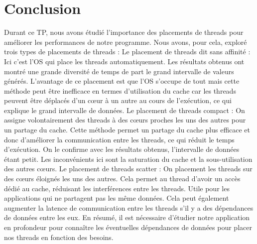 \documentclass{rapport}
\begin{document}
    \part{Conclusion}
    Durant ce TP, nous avons étudié l'importance des placements de threads pour améliorer les performances de notre programme. Nous avons, pour cela, exploré trois types de placements de threads : 
    \newline \indent
        Le placement de threads dit sans affinité : Ici c'est l'OS qui place les threads automatiquement. Les résultats obtenus ont montré une grande diversité de temps de part le grand intervalle de valeurs générés. L'avantage de ce placement est que l'OS s'occupe de tout mais cette méthode peut être inefficace en termes d'utilisation du cache car les threads peuvent être déplacés d'un cœur à un autre au cours de l'exécution, ce qui explique le grand intervalle de données.
        \newline \indent
        Le placement de threads compact : On assigne volontairement des threads à des cœurs proches les uns des autres pour un partage du cache. Cette méthode permet un partage du cache plus efficace et donc d'améliorer la communication entre les threads, ce qui réduit le temps d'exécution. On le confirme avec les résultats obtenus, l'intervalle de données étant petit. Les inconvénients ici sont la saturation du cache et la sous-utilisation des autres cœurs.
        \newline \indent
        Le placement de threads scatter : On placement les threads sur des cœurs éloignés les uns des autres. Cela permet au thread d'avoir un accès dédié au cache, réduisant les interférences entre les threads. Utile pour les applications qui ne partagent pas les même données. Cela peut également augmenter la latence de communication entre les threads s'il y a des dépendances de données entre les eux.
        \newline
        \indent
        En résumé, il est nécessaire d'étudier notre application en profondeur pour connaître les éventuelles dépendances de données pour placer nos threads en fonction des besoins.
\end{document}
